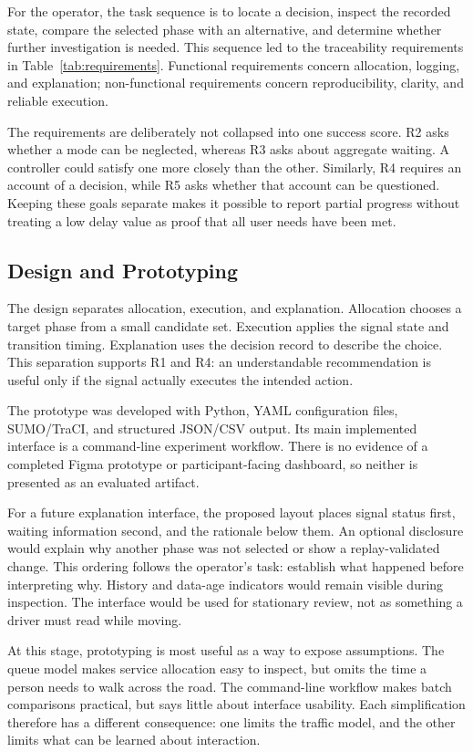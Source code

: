 \documentclass[sigconf]{acmart}
\begin{document}
For the operator, the task sequence is to locate a decision, inspect
the recorded state, compare the selected phase with an alternative,
and determine whether further investigation is needed. This sequence
led to the traceability requirements in Table~\ref{tab:requirements}.
Functional requirements concern allocation, logging, and explanation;
non-functional requirements concern reproducibility, clarity, and
reliable execution.

The requirements are deliberately not collapsed into one success
score. R2 asks whether a mode can be neglected, whereas R3 asks
about aggregate waiting. A controller could satisfy one more closely
than the other. Similarly, R4 requires an account of a decision, while
R5 asks whether that account can be questioned. Keeping these goals
separate makes it possible to report partial progress without treating
a low delay value as proof that all user needs have been met.

\subsection{Design and Prototyping}
The design separates allocation, execution, and explanation. Allocation
chooses a target phase from a small candidate set. Execution applies
the signal state and transition timing. Explanation uses the decision
record to describe the choice. This separation supports R1 and R4:
an understandable recommendation is useful only if the signal
actually executes the intended action.

The prototype was developed with Python, YAML configuration files,
SUMO/TraCI, and structured JSON/CSV output. Its main implemented
interface is a command-line experiment workflow. There is no evidence
of a completed Figma prototype or participant-facing dashboard, so
neither is presented as an evaluated artifact.

For a future explanation interface, the proposed layout places signal
status first, waiting information second, and the rationale below them.
An optional disclosure would explain why another phase was not
selected or show a replay-validated change. This ordering follows the
operator's task: establish what happened before interpreting why.
History and data-age indicators would remain visible during
inspection. The interface would be used for stationary review, not as
something a driver must read while moving.

At this stage, prototyping is most useful as a way to expose
assumptions. The queue model makes service allocation easy to
inspect, but omits the time a person needs to walk across the road.
The command-line workflow makes batch comparisons practical,
but says little about interface usability. Each simplification
therefore has a different consequence: one limits the traffic model,
and the other limits what can be learned about interaction.
\end{document}
